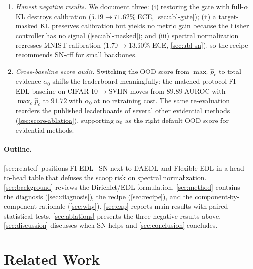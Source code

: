 \documentclass[review,5p,times]{elsarticle}
\begin{document}
\begin{enumerate}
        (\autoref{tab:main-cifar100}).
  \item \emph{Honest negative results.} We document three: (i) restoring
        the gate with full-$\alpha$ KL destroys calibration
        ($5.19\!\to\!71.62\%$ ECE, \autoref{sec:abl-gate}); (ii) a target-
        masked KL preserves calibration but yields no metric gain because
        the Fisher controller has no signal
        (\autoref{sec:abl-masked}); and (iii) spectral normalization
        regresses MNIST calibration ($1.70\!\to\!13.60\%$ ECE,
        \autoref{sec:abl-sn}), so the recipe recommends SN-off for small
        backbones.
  \item \emph{Cross-baseline score audit.} Switching the OOD score from
        $\max_c\hat p_c$ to total evidence $\alpha_0$ shifts the
        leaderboard meaningfully: the matched-protocol FI-EDL baseline on
        CIFAR-10$\to$SVHN moves from $89.89$ AUROC with $\max_c\hat p_c$
        to $91.72$ with $\alpha_0$ at no retraining cost. The same
        re-evaluation reorders the published leaderboards of several
        other evidential methods (\autoref{sec:score-ablation}),
        supporting $\alpha_0$ as the right default OOD score for
        evidential methods.
\end{enumerate}

\paragraph{Outline.}
\autoref{sec:related} positions FI-EDL+SN next to DAEDL and Flexible EDL
in a head-to-head table that defuses the scoop risk on spectral
normalization. \autoref{sec:background} reviews the Dirichlet/EDL
formulation. \autoref{sec:method} contains the diagnosis
(\autoref{sec:diagnosis}), the recipe (\autoref{sec:recipe}), and the
component-by-component rationale (\autoref{sec:why}). \autoref{sec:exp}
reports main results with paired statistical tests. \autoref{sec:ablations}
presents the three negative results above. \autoref{sec:discussion}
discusses when SN helps and \autoref{sec:conclusion} concludes.

\section{Related Work}\label{sec:related}
\end{document}
